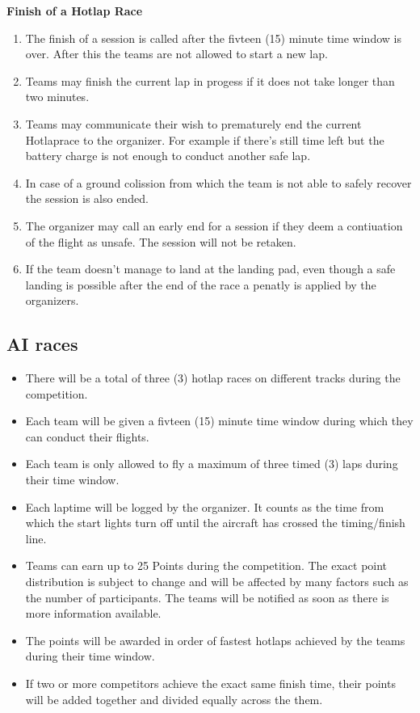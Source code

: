     \textbf{Finish of a Hotlap Race}
    \begin{enumerate}[resume]
      \item The finish of a session is called after the fivteen (15) minute time window is over. After this the teams are not allowed to start a new lap.
      \item Teams may finish the current lap in progess if it does not take longer than two minutes.
      \item Teams may communicate their wish to prematurely end the current Hotlaprace to the organizer. For example if there's still time left but the battery charge is not enough to conduct another safe lap.
      \item In case of a ground colission from which the team is not able to safely recover the session is also ended. 
      \item The organizer may call an early end for a session if they deem a contiuation of the flight as unsafe. The session will not be retaken.  
      \item If the team doesn't manage to land at the landing pad, even though a safe landing is possible after the end of the race a penatly is applied by the organizers.
    \end{enumerate}

    \subsection{AI races}
    \begin{itemize}
      \item There will be a total of three (3) hotlap races on different tracks during the competition. 
      \item Each team will be given a fivteen (15) minute time window during which they can conduct their flights. 
      \item Each team is only allowed to fly a maximum of three timed (3) laps during their time window. 
      \item Each laptime will be logged by the organizer. It counts as the time from which the start lights turn off until the aircraft has crossed the timing/finish line. 
      \item Teams can earn up to 25 Points during the competition. The exact point distribution is subject to change and will be affected by many factors such as the number of participants.
      The teams will be notified as soon as there is more information available.
      \item The points will be awarded in order of fastest hotlaps achieved by the teams during their time window.
      \item If two or more competitors achieve the exact same finish time, their points will be added together and divided equally across the them.  
    \end{itemize}

